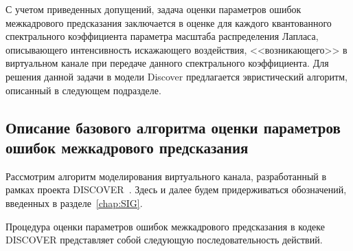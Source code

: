 С учетом приведенных допущений, задача оценки параметров ошибок межкадрового предсказания заключается в оценке для каждого квантованного спектрального коэффициента параметра масштаба распределения Лапласа, описывающего интенсивность искажающего воздействия, <<возникающего>> в виртуальном канале при передаче данного спектрального коэффициента. Для решения данной задачи в модели Discover предлагается эвристический алгоритм, описанный в следующем подразделе.

\subsection{Описание базового алгоритма оценки параметров ошибок межкадрового предсказания}
\label{chap:CNM:ReferenceAlgo:AlgoDescription}

Рассмотрим алгоритм моделирования виртуального канала, разработанный в рамках проекта DISCOVER~\cite{4498429}. Здесь и далее будем придерживаться обозначений, введенных в разделе~\ref{chap:SIG}. 

Процедура оценки параметров ошибок межкадрового предсказания в кодеке DISCOVER представляет собой следующую последовательность действий.

